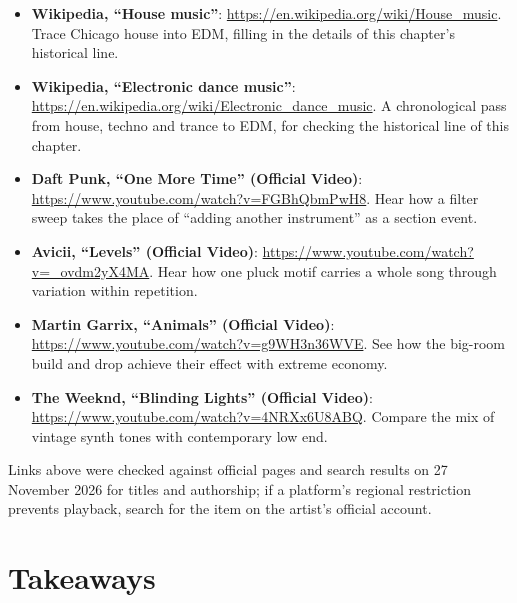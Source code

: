\begin{sloppypar}
\begin{itemize}
\item \textbf{Wikipedia, ``House music''}: \url{https://en.wikipedia.org/wiki/House_music}. Trace Chicago house into EDM, filling in the details of this chapter's historical line.
\item \textbf{Wikipedia, ``Electronic dance music''}: \url{https://en.wikipedia.org/wiki/Electronic_dance_music}. A chronological pass from house, techno and trance to EDM, for checking the historical line of this chapter.
\item \textbf{Daft Punk, ``One More Time'' (Official Video)}: \url{https://www.youtube.com/watch?v=FGBhQbmPwH8}. Hear how a filter sweep takes the place of ``adding another instrument'' as a section event.
\item \textbf{Avicii, ``Levels'' (Official Video)}: \url{https://www.youtube.com/watch?v=_ovdm2yX4MA}. Hear how one pluck motif carries a whole song through variation within repetition.
\item \textbf{Martin Garrix, ``Animals'' (Official Video)}: \url{https://www.youtube.com/watch?v=g9WH3n36WVE}. See how the big-room build and drop achieve their effect with extreme economy.
\item \textbf{The Weeknd, ``Blinding Lights'' (Official Video)}: \url{https://www.youtube.com/watch?v=4NRXx6U8ABQ}. Compare the mix of vintage synth tones with contemporary low end.
\end{itemize}
\end{sloppypar}

Links above were checked against official pages and search results on 27 November 2026 for titles and authorship; if a platform's regional restriction prevents playback, search for the item on the artist's official account.

\section{Takeaways}
\label{sec:edm-takeaways}

